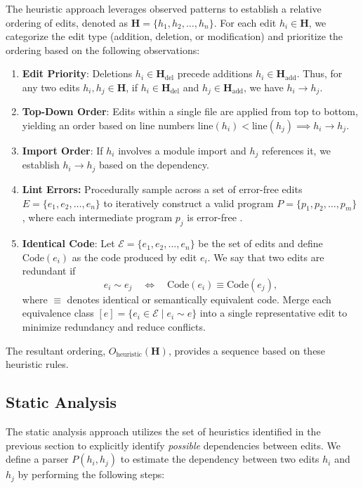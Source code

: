 The heuristic approach leverages observed patterns to establish a relative ordering of edits, denoted as \(\mathbf{H} = \{ h_1, h_2, \dots, h_n \}\). For each edit \( h_i \in \mathbf{H} \), we categorize the edit type (addition, deletion, or modification) and prioritize the ordering based on the following observations:

\begin{enumerate}
\item \textbf{Edit Priority}: Deletions \( h_i \in \mathbf{H}_{\text{del}} \) precede additions \( h_i \in \mathbf{H}_{\text{add}} \). Thus, for any two edits \( h_i, h_j \in \mathbf{H} \), if \( h_i \in \mathbf{H}_{\text{del}} \) and \( h_j \in \mathbf{H}_{\text{add}} \), we have \( h_i \rightarrow h_j \).
\item \textbf{Top-Down Order}: Edits within a single file are applied from top to bottom, yielding an order based on line numbers \( \text{line}(h_i) < \text{line}(h_j) \implies h_i \rightarrow h_j \).
\item \textbf{Import Order}: If \( h_i \) involves a module import and \( h_j \) references it, we establish \( h_i \rightarrow h_j \) based on the dependency.
\item \textbf{Lint Errors:} Procedurally sample across a set of error-free edits \( E = \{e_1, e_2, \dots, e_n\} \) to iteratively construct a valid program \( P = \{p_1, p_2, \dots, p_m\} \), where each intermediate program \( p_j \) is error-free \cite{jimenez2023, pandey2024}.
\item \textbf{Identical Code}: Let $\mathcal{E} = \{e_1, e_2, \dots, e_n\}$ be the set of edits and define $\mathrm{Code}(e_i)$ as the code produced by edit $e_i$. We say that two edits are redundant if 
\[
e_i \sim e_j \quad \Longleftrightarrow \quad \mathrm{Code}(e_i) \equiv \mathrm{Code}(e_j),
\]
where $\equiv$ denotes identical or semantically equivalent code. Merge each equivalence class $[e] = \{e_i \in \mathcal{E} \mid e_i \sim e\}$ into a single representative edit to minimize redundancy and reduce conflicts.
\end{enumerate}


The resultant ordering, \( O_{\text{heuristic}}(\mathbf{H}) \), provides a sequence based on these heuristic rules. 

\subsection{Static Analysis}

The static analysis approach utilizes the set of heuristics identified in the previous section to explicitly identify \textit{possible} dependencies between edits. We define a parser \( P(h_i, h_j) \) to estimate the dependency between two edits \( h_i \) and \( h_j \) by performing the following steps:

